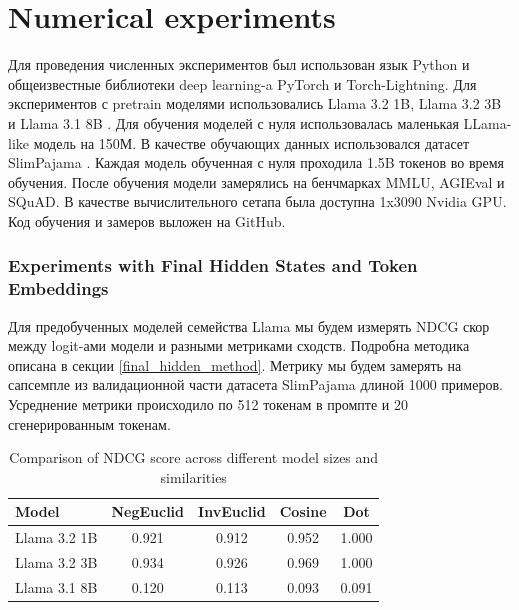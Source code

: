 \chapter{Numerical experiments}

Для проведения численных экспериментов был использован язык Python и общеизвестные библиотеки deep learning-a PyTorch\cite{TODO} и Torch-Lightning\cite{TODO}. Для экспериментов с pretrain моделями использовались Llama 3.2 1B, Llama 3.2 3B и Llama 3.1 8B \cite{TODO}. Для обучения моделей с нуля использовалась маленькая LLama-like модель на 150М. В качестве обучающих данных использовался датасет SlimPajama \cite{TODO}. Каждая модель обученная с нуля проходила 1.5B токенов во время обучения. После обучения модели замерялись на бенчмарках MMLU\cite{TODO}, AGIEval\cite{TODO} и SQuAD\cite{TODO}. В качестве вычислительного сетапа была доступна 1x3090 Nvidia GPU. Код обучения и замеров выложен на GitHub\cite{TODO}.

\subsection{Experiments with Final Hidden States and Token Embeddings}

Для предобученных моделей семейства Llama мы будем измерять NDCG скор между logit-ами модели и разными метриками сходств. Подробна методика описана в секции \ref{final_hidden_method}. Метрику мы будем замерять на сапсемпле из валидационной части датасета SlimPajama длиной 1000 примеров. Усреднение метрики происходило по 512 токенам в промпте и 20 сгенерированным токенам.


\begin{table}[h]
    \centering
    \caption{Comparison of NDCG score across different model sizes and similarities}
    \begin{tabular}{lcccc}
    \toprule
    Model & NegEuclid & InvEuclid & Cosine & Dot \\
    \midrule
    Llama 3.2 1B & 0.921 & 0.912  & 0.952 & 1.000 \\
    Llama 3.2 3B & 0.934 & 0.926  & 0.969 & 1.000 \\
    Llama 3.1 8B & 0.120 & 0.113  & 0.093 & 0.091 \\
    \bottomrule
    \end{tabular}
    \label{tab:pretrained_last_hidden_scores}
\end{table}

